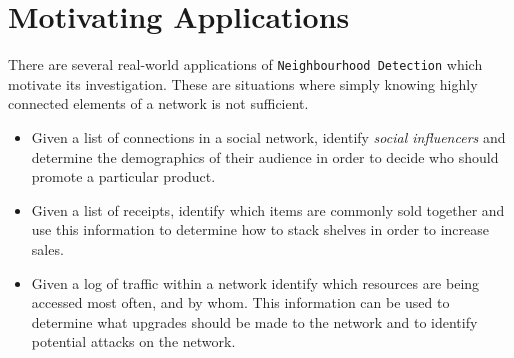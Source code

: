 \documentclass[11pt,twoside,a4paper]{report}
\begin{document}
\section{Motivating Applications} %

There are several real-world applications of \texttt{Neighbourhood Detection} which motivate its investigation. These are situations where simply knowing highly connected elements of a network is not sufficient.
\begin{itemize}
	\item Given a list of connections in a social network, identify \textit{social influencers} and determine the demographics of their audience in order to decide who should promote a particular product.
	\item Given a list of receipts, identify which items are commonly sold together and use this information to determine how to stack shelves in order to increase sales.
	\item Given a log of traffic within a network identify which resources are being accessed most often, and by whom. This information can be used to determine what upgrades should be made to the network and to identify potential attacks on the network.
\end{itemize}
\end{document}
